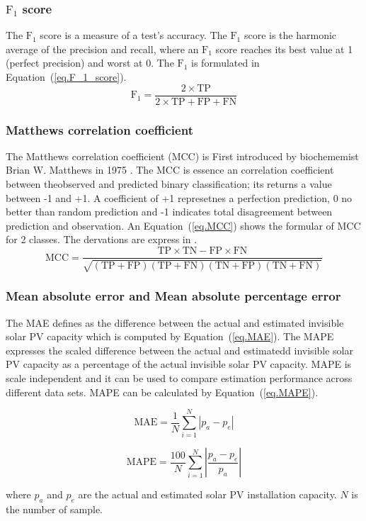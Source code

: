   \subsubsection{$\text{F}_{1}$ score}
  The $\text{F}_{1}$ score is a measure of a test's accuracy.
  The $\text{F}_{1}$ score is the harmonic average of the precision and recall, where an $\text{F}_{1}$ score reaches its best value at 1 (perfect precision) and worst at 0.
  The $\text{F}_{1}$ is formulated in Equation~(\ref{eq.F_1_score}).
  \begin{equation}
    \text{F}_{1}=\frac{2\times \text{TP}}{2\times \text{TP} + \text{FP} + \text{FN}}
  \label{eq.F_1_score}
  \end{equation}

  \subsubsection{Matthews correlation coefficient}
  The Matthews correlation coefficient (MCC) is First introduced by biochememist Brian W. Matthews in 1975 \cite{b28}.
  The MCC is essence an correlation coefficient between theobserved and predicted binary classification; its returns a value between -1 and +1.
  A coefficient of +1 represetnes a perfection prediction, 0 no better than random prediction and -1 indicates total disagreement between prediction and observation.
  An Equation~(\ref{eq.MCC}) shows the formular of MCC for 2 classes. The dervations are express in \cite{b29}.
  \begin{equation}
    \text{MCC}=\frac{\text{TP} \times \text{TN} - \text{FP} \times \text{FN}}{\sqrt{(\text{TP}+\text{FP})(\text{TP}+\text{FN})(\text{TN}+\text{FP})(\text{TN}+\text{FN})}}
  \label{eq.MCC}
  \end{equation}

  \subsubsection{Mean absolute error and Mean absolute percentage error}
  The MAE defines as the difference between the actual and estimated invisible solar PV capacity which is computed by Equation~(\ref{eq.MAE}).
  The MAPE expresses the scaled difference between the actual and estimatedd invisible solar PV capacity as a percentage of the actual invisible solar PV capacity.
  MAPE is scale independent and it can be used to compare estimation performance across different data sets. MAPE can be calculated by Equation~(\ref{eq.MAPE}).

  \begin{equation}
    \text{MAE} = \frac{1}{N}\sum_{i=1}^{N} \left| p_{a}-p_{e} \right|
  \label{eq.MAE}
  \end{equation}

  \begin{equation}
    \text{MAPE} = \frac{100}{N}\sum_{i=1}^{N} \left| \frac{p_{a}-p_{e}}{p_{a}} \right|
  \label{eq.MAPE}
  \end{equation}

  where $p_{a}$ and $p_{e}$ are the actual and estimated solar PV installation capacity. $N$ is the number of sample.
